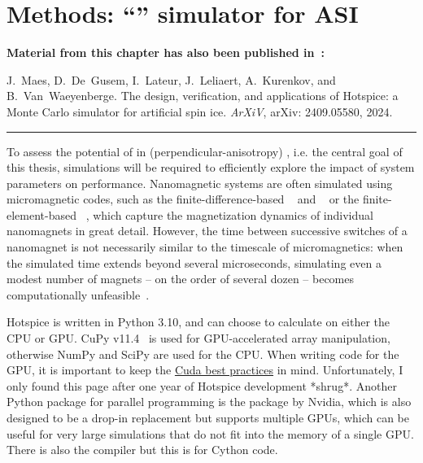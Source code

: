\chapter{Methods: ``\hotspice'' simulator for ASI}\label{ch:Hotspice}

\begin{adjustwidth}{2em}{2em} %
    \begin{center}
        \textbf{Material from this chapter has also been published in~\cite{MAES-24}:} \\
    \end{center}
    \vspace{1em}
    J.~Maes, D.~De~Gusem, I.~Lateur, J.~Leliaert, A.~Kurenkov, and B.~Van~Waeyenberge.
    \newblock The design, verification, and applications of Hotspice: a Monte Carlo simulator for artificial spin ice.
    \newblock \emph{ArXiV}, arXiv: 2409.05580, 2024.
    \vspace{1em}
    \begin{center}
        \centering\rule{0.6\linewidth}{0.4pt}
    \end{center}
    \vspace{1em}
\end{adjustwidth}

To assess the potential of  in (perpendicular-anisotropy) , i.e. the central goal of this thesis, simulations will be required to efficiently explore the impact of system parameters on performance. Nanomagnetic systems are often simulated using micromagnetic codes, such as the finite-difference-based \mumax~\cite{mumax3} and \oommf~\cite{OOMMF} or the finite-element-based \nmag~\cite{Nmag}, which capture the magnetization dynamics of individual nanomagnets in great detail. However, the time between successive switches of a nanomagnet is not necessarily similar to the timescale of micromagnetics: when the simulated time extends beyond several microseconds, simulating even a modest number of magnets -- on the order of several dozen -- becomes computationally unfeasible~\cite{leo2021chiral}. \par %

Hotspice is written in Python 3.10, and can choose to calculate on either the CPU or GPU.
CuPy v11.4~\cite{CuPy} is used for GPU-accelerated array manipulation, otherwise NumPy and SciPy are used for the CPU.
When writing code for the GPU, it is important to keep the \href{https://docs.nvidia.com/cuda/cuda-c-best-practices-guide/index.html}{Cuda best practices} in mind.
Unfortunately, I only found this page after one year of Hotspice development *shrug*.
Another Python package for parallel programming is the  package by Nvidia, which is also designed to be a drop-in  replacement but supports multiple GPUs, which can be useful for very large simulations that do not fit into the memory of a single GPU.
There is also the  compiler but this is for Cython code. \par

